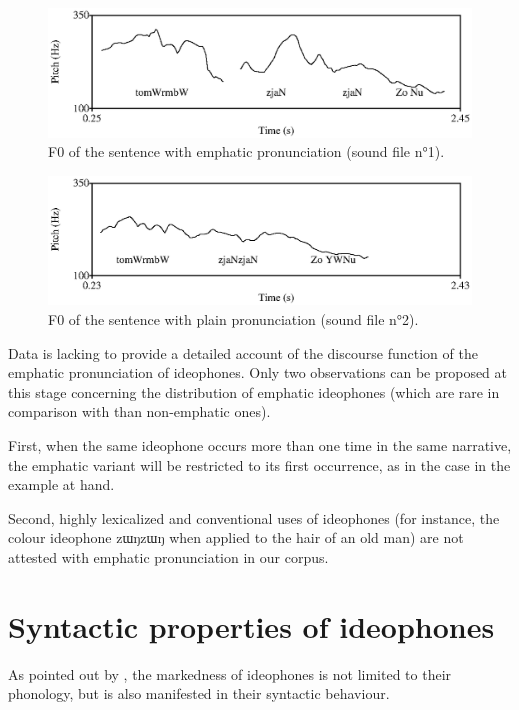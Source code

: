 \documentclass[oldfontcommands,oneside,a4paper,11pt]{article}
\newcommand{\ipa}[1]{{\phon \mbox{#1}}} %
\begin{document}
 \begin{figure}
 \caption{F0 of the sentence with emphatic pronunciation   (sound file n°1). }
\label{fig:zjaNzjaN1}  
\includegraphics{sentence1.eps}
\end{figure}

 \begin{figure}
 \caption{F0 of the sentence with plain pronunciation   (sound file n°2). }
\label{fig:zjaNzjaN2}  
\includegraphics{sentence2.eps}
\end{figure}



Data is lacking to provide a detailed account of the   discourse function of the emphatic pronunciation of ideophones.  Only two observations can be proposed at this stage concerning the distribution of emphatic ideophones (which are   rare  in comparison with than non-emphatic ones). 

First, when the same ideophone occurs more than one time in the same narrative, the emphatic variant will be restricted to its first occurrence, as in the case in the example at hand. 

Second, highly lexicalized and conventional uses of ideophones (for instance, the colour ideophone \ipa{zɯŋzɯŋ} when applied to the hair of an old man) are not attested with emphatic pronunciation in our corpus.



  \section{Syntactic properties of ideophones}
As pointed out by \citet[660]{dingemanse12ideo}, the markedness of ideophones is not limited to their phonology, but is also manifested in their syntactic behaviour.
\end{document}
